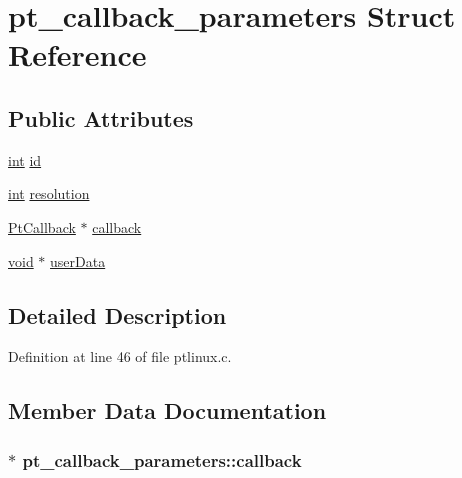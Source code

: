 \hypertarget{structpt__callback__parameters}{}\section{pt\+\_\+callback\+\_\+parameters Struct Reference}
\label{structpt__callback__parameters}
\subsection*{Public Attributes}
\begin{DoxyCompactItemize}
\item 
\hyperlink{xmltok_8h_a5a0d4a5641ce434f1d23533f2b2e6653}{int} \hyperlink{structpt__callback__parameters_aacadd50758ca9ababae9a1db0b6cbc63}{id}
\item 
\hyperlink{xmltok_8h_a5a0d4a5641ce434f1d23533f2b2e6653}{int} \hyperlink{structpt__callback__parameters_a6fbc94070203cea7f70c85f2fe1b205c}{resolution}
\item 
\hyperlink{porttime_8h_a41902497f5f1087f9ad9277a93166fd0}{Pt\+Callback} $\ast$ \hyperlink{structpt__callback__parameters_a678d163dd60f8597c9e79abab9bacfb0}{callback}
\item 
\hyperlink{sound_8c_ae35f5844602719cf66324f4de2a658b3}{void} $\ast$ \hyperlink{structpt__callback__parameters_ade1aadaf39085d58efdbca011bdd8ed3}{user\+Data}
\end{DoxyCompactItemize}


\subsection{Detailed Description}


Definition at line 46 of file ptlinux.\+c.



\subsection{Member Data Documentation}
\subsubsection[{\texorpdfstring{callback}{callback}}]{ $\ast$ pt\+\_\+callback\+\_\+parameters\+::callback}\hypertarget{structpt__callback__parameters_a678d163dd60f8597c9e79abab9bacfb0}{}\label{structpt__callback__parameters_a678d163dd60f8597c9e79abab9bacfb0}


